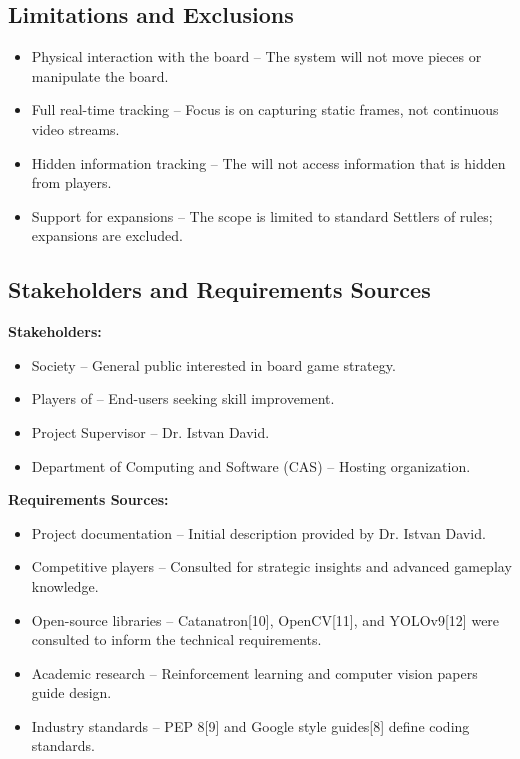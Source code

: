 \documentclass{article}
\begin{document}
\subsection{Limitations and Exclusions}\label{subsec:limitations-and-exclusions}
\begin{itemize}
    \item {Physical interaction with the board} – The system will not move pieces or manipulate the board.
    \item {Full real-time tracking} – Focus is on capturing static frames, not continuous video streams.
    \item {Hidden information tracking} – The \AI{} will not access information that is hidden from players.
    \item {Support for expansions} – The scope is limited to standard Settlers of \emph{\Catan{}} rules; expansions are excluded.
\end{itemize}

\subsection{Stakeholders and Requirements Sources}\label{subsec:stakeholders-and-requirements-sources}
\textbf{Stakeholders:}
\begin{itemize}
    \item Society – General public interested in board game strategy.
    \item Players of \emph{\Catan{}} – End-users seeking skill improvement.
    \item Project Supervisor – Dr. Istvan David.
    \item Department of Computing and Software (CAS) – Hosting organization.
\end{itemize}

\noindent\textbf{Requirements Sources:}
\begin{itemize}
    \item Project documentation – Initial description provided by Dr. Istvan David.
    \item Competitive \emph{\Catan{}} players – Consulted for strategic insights and advanced gameplay knowledge.
    \item Open-source libraries – Catanatron[10], OpenCV[11], and YOLOv9[12] were consulted to inform the technical requirements.
    \item Academic research – Reinforcement learning and computer vision papers guide \AI{} design.
    \item Industry standards – PEP 8[9] and Google style guides[8] define coding standards.
\end{itemize}
\end{document}
